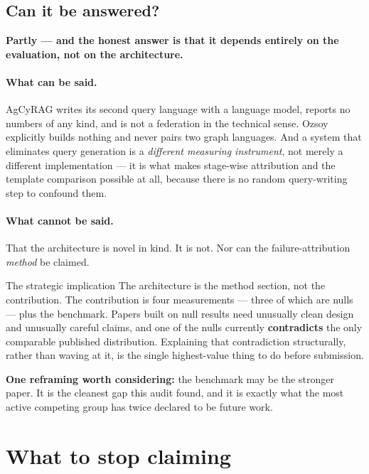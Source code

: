 \documentclass[11pt,a4paper]{article}
\begin{document}
\subsection{Can it be answered?}

\textbf{Partly --- and the honest answer is that it depends entirely on the
evaluation, not on the architecture.}

\paragraph{What can be said.} AgCyRAG writes its second query language with a
language model, reports no numbers of any kind, and is not a federation in the
technical sense. Ozsoy explicitly builds nothing and never pairs two graph
languages. And a system that eliminates query generation is a \emph{different
measuring instrument}, not merely a different implementation --- it is what makes
stage-wise attribution and the template comparison possible at all, because there
is no random query-writing step to confound them.

\paragraph{What cannot be said.} That the architecture is novel in kind. It is not.
Nor can the failure-attribution \emph{method} be claimed.

\begin{alertbox}{The strategic implication}
The architecture is the method section, not the contribution. The contribution is
four measurements --- three of which are nulls --- plus the benchmark. Papers built
on null results need unusually clean design and unusually careful claims, and one
of the nulls currently \textbf{contradicts} the only comparable published
distribution. Explaining that contradiction structurally, rather than waving at it,
is the single highest-value thing to do before submission.

\vspace{4pt}
\textbf{One reframing worth considering:} the benchmark may be the stronger paper. It
is the cleanest gap this audit found, and it is exactly what the most active
competing group has twice declared to be future work.
\end{alertbox}

\newpage
\section{What to stop claiming}
\end{document}
